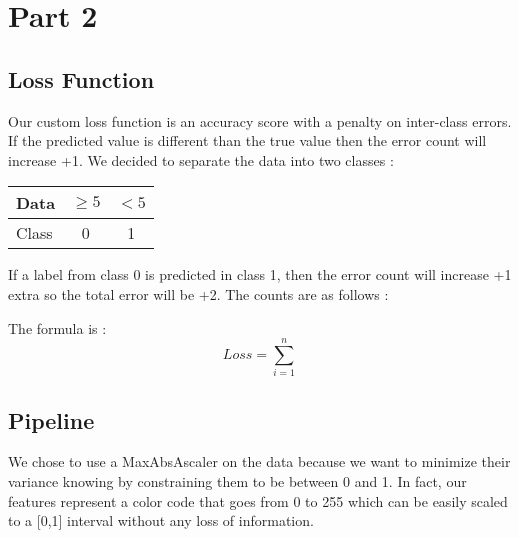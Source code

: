 \section{Part 2}

\subsection{Loss Function}
Our custom loss function is an accuracy score with a penalty on inter-class errors. If the predicted value is different than the true value then the error count will increase +1. We decided to separate the data into two classes : 
\begin{table}[hbt]
\centering
  \begin{tabular}{l|c|c}
   Data & $\geq 5$ & $<5$ \\
    \hline
   Class & 0 & 1 
  \end{tabular}
\end{table}

If a label from class 0 is predicted in class 1, then the error count will increase +1 extra so the total error will be +2. The counts are as follows : 


The formula is : 
\begin{equation*}
	Loss = \sum^n_{i=1} 
\end{equation*}

\subsection{Pipeline}
We chose to use a MaxAbsAscaler on the data because we want to minimize their variance knowing by constraining them to be between 0 and 1. In fact, our features represent a color code that goes from 0 to 255 which can be easily scaled to a [0,1] interval without any loss of information. 